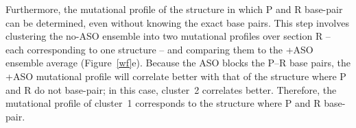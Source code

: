 \documentclass[main.tex]{subfiles}
\begin{document}
Furthermore, the mutational profile of the structure in which P and R base-pair can be determined, even without knowing the exact base pairs.
This step involves clustering the no-ASO ensemble into two mutational profiles over section R -- each corresponding to one structure -- and comparing them to the +ASO ensemble average (Figure~\ref{wf}e).
Because the ASO blocks the P--R base pairs, the +ASO mutational profile will correlate better with that of the structure where P and R do not base-pair; in this case, cluster~2 correlates better.
Therefore, the mutational profile of cluster~1 corresponds to the structure where P and R base-pair.

%
%
%
\end{document}
